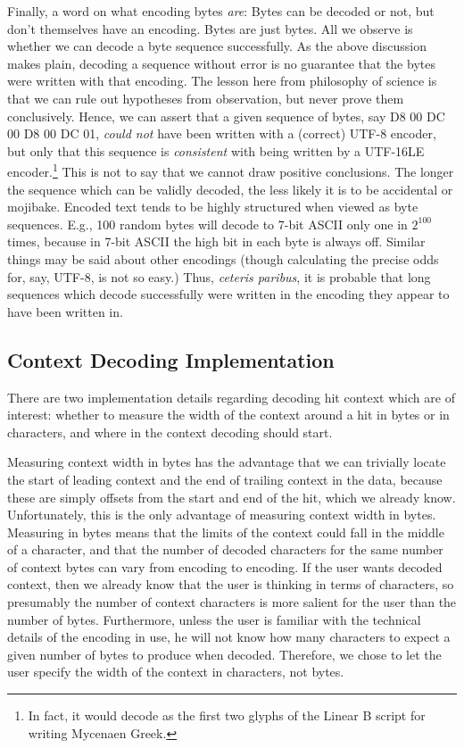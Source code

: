 \documentclass[5p,final,number,sort&compress]{elsarticle}
\begin{document}
Finally, a word on what encoding bytes \emph{are}: Bytes can be decoded or not, but don't themselves have an encoding. Bytes are just bytes. All we observe is whether we can decode a byte sequence successfully. As the above discussion makes plain, decoding a sequence without error is no guarantee that the bytes were written with that encoding. The lesson here from philosophy of science is that we can rule out hypotheses from observation, but never prove them conclusively. Hence, we can assert that a given sequence of bytes, say D8 00 DC 00 D8 00 DC 01, \emph{could not} have been written with a (correct) UTF-8 encoder, but only that this sequence is \emph{consistent} with being written by a UTF-16LE encoder.\footnote{In fact, it would decode as the first two glyphs of the Linear B script for writing Mycenaen Greek.} This is not to say that we cannot draw positive conclusions. The longer the sequence which can be validly decoded, the less likely it is to be accidental or mojibake. Encoded text tends to be highly structured when viewed as byte sequences. E.g., 100 random bytes will decode to 7-bit ASCII only one in $2^{100}$ times, because in 7-bit ASCII the high bit in each byte is always off. Similar things may be said about other encodings (though calculating the precise odds for, say, UTF-8, is not so easy.) Thus, \emph{ceteris paribus}, it is probable that long sequences which decode successfully were written in the encoding they appear to have been written in.

\subsection{Context Decoding Implementation}

There are two implementation details regarding decoding hit context which are of interest: whether to measure the width of the context around a hit in bytes or in characters, and where in the context decoding should start.

Measuring context width in bytes has the advantage that we can trivially locate the start of leading context and the end of trailing context in the data, because these are simply offsets from the start and end of the hit, which we already know. Unfortunately, this is the only advantage of measuring context width in bytes. Measuring in bytes means that the limits of the context could fall in the middle of a character, and that the number of decoded characters for the same number of context bytes can vary from encoding to encoding. If the user wants decoded context, then we already know that the user is thinking in terms of characters, so presumably the number of context characters is more salient for the user than the number of bytes. Furthermore, unless the user is familiar with the technical details of the encoding in use, he will not know how many characters to expect a given number of bytes to produce when decoded. Therefore, we chose to let the user specify the width of the context in characters, not bytes.
\end{document}
